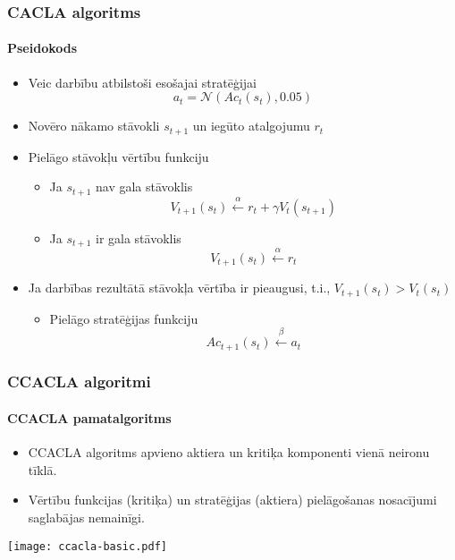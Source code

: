 \documentclass[xetex,mathserif]{beamer}
\begin{document}
  \begin{frame}
    \frametitle{CACLA algoritms}
    \framesubtitle{Pseidokods}
    \begin{itemize}
      \item Veic darbību atbilstoši esošajai stratēģijai
        \begin{equation*}
          a_t = \mathcal{N}\left(Ac_t(s_t), 0.05\right)
        \end{equation*}
      \item Novēro nākamo stāvokli $s_{t+1}$ un iegūto atalgojumu $r_{t}$
      \item Pielāgo stāvokļu vērtību funkciju
        \begin{itemize}
          \item Ja $s_{t+1}$ nav gala stāvoklis
            \begin{equation*}
              V_{t+1}(s_t) \xleftarrow{\alpha} r_t + \gamma V_t(s_{t + 1})
            \end{equation*}
          \item Ja $s_{t+1}$ ir gala stāvoklis
            \begin{equation*}
              V_{t+1}(s_t) \xleftarrow{\alpha} r_t
            \end{equation*}
        \end{itemize}
      \item Ja darbības rezultātā stāvokļa vērtība ir pieaugusi, t.i., $V_{t+1}(s_t)
        > V_t(s_t)$
        \begin{itemize}
          \item Pielāgo stratēģijas funkciju
            \begin{equation*}
              Ac_{t+1}(s_t) \xleftarrow{\beta} a_t
            \end{equation*}
        \end{itemize}
    \end{itemize}
  \end{frame}

  \begin{frame}
    \frametitle{CCACLA algoritmi}
    \framesubtitle{CCACLA pamatalgoritms}
    \begin{itemize}
      \item CCACLA algoritms apvieno aktiera un kritiķa komponenti vienā neironu
        tīklā.
      \item Vērtību funkcijas (kritiķa) un stratēģijas (aktiera) pielāgošanas
        nosacījumi saglabājas nemainīgi.
    \end{itemize}
    \begin{center}
      \hspace{2cm} \texttt{[image: ccacla-basic.pdf]}
    \end{center}
  \end{frame}
\end{document}
